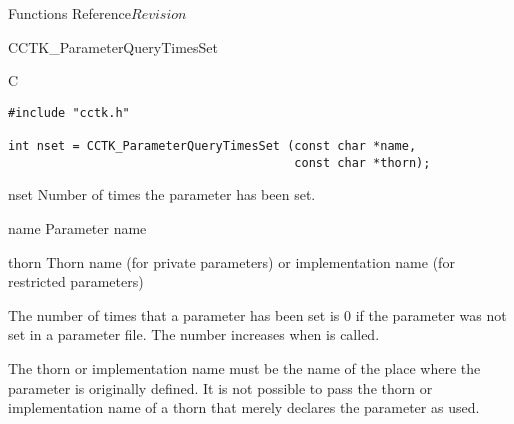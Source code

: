 \begin{cactuspart}{ Functions Reference}{}{$Revision$}
\begin{FunctionDescription}{CCTK\_ParameterQueryTimesSet}
\begin{SynopsisSection}
\begin{Synopsis}{C}
\begin{verbatim}
#include "cctk.h"

int nset = CCTK_ParameterQueryTimesSet (const char *name,
                                        const char *thorn);
\end{verbatim}
\end{Synopsis}
\end{SynopsisSection}

\begin{ResultSection}
\begin{Result}{nset}
Number of times the parameter has been set.
\end{Result}
\end{ResultSection}

\begin{ParameterSection}
\begin{Parameter}{name}
Parameter name
\end{Parameter}
\begin{Parameter}{thorn}
Thorn name (for private parameters) or implementation name (for
restricted parameters)
\end{Parameter}
\end{ParameterSection}

\begin{Discussion}
The number of times that a parameter has been set is 0 if the
parameter was not set in a parameter file.  The number increases when
 is called.

The thorn or implementation name must be the name of the place where
the parameter is originally defined.  It is not possible to pass the
thorn or implementation name of a thorn that merely declares the
parameter as used.
\end{Discussion}


\end{FunctionDescription}
\end{cactuspart}

